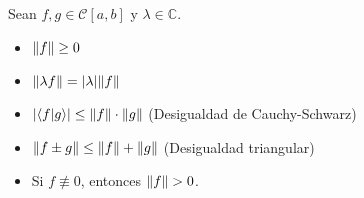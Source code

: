 \begin{propo}
Sean $f,g \in \mathscr{C}[a,b]$ y $\lambda \in \mathbb{C}$.

\begin{itemize}
    \item $\lVert f\rVert \geq 0$
    \item $\lVert\lambda f\rVert = |\lambda| \lVert f\rVert$
    \item $|\langle f| g \rangle | \leq \lVert f\rVert \cdot \lVert g\rVert$ (Desigualdad de Cauchy-Schwarz)
    \item $\lVert f \pm g\rVert \leq \lVert f\rVert + \lVert g\rVert$ (Desigualdad triangular)
    \item Si $f \not\equiv 0$, entonces $\lVert f\rVert > 0$.
\end{itemize}
\end{propo}

